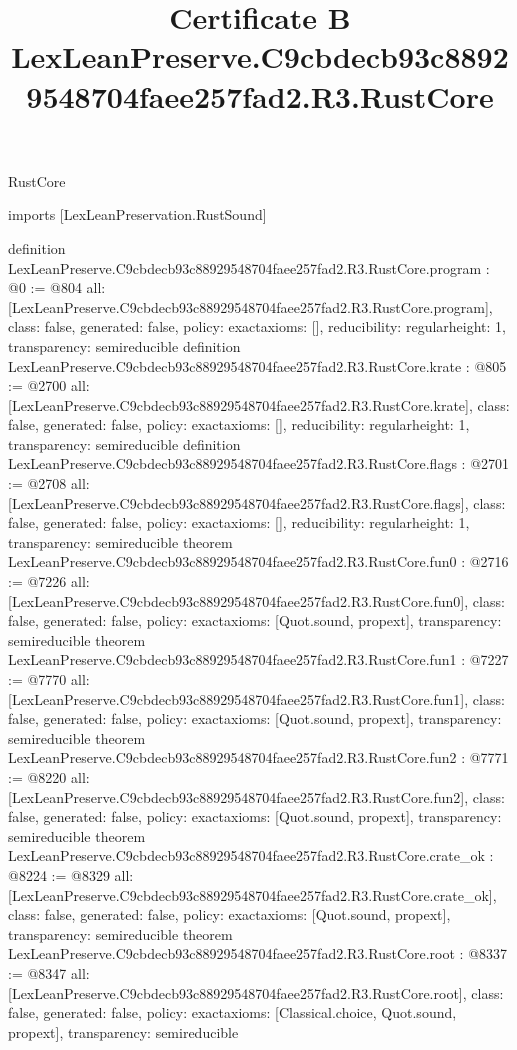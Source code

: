\begin{lexlean}{RustCore}
\title{Certificate B LexLeanPreserve.C9cbdecb93c88929548704faee257fad2.R3.RustCore}
\begin{coremodule}
imports [LexLeanPreservation.RustSound]

definition LexLeanPreserve.C9cbdecb93c88929548704faee257fad2.R3.RustCore.program : @0 := @804 {
  all: [LexLeanPreserve.C9cbdecb93c88929548704faee257fad2.R3.RustCore.program],
  class: false,
  generated: false,
  policy: exact{axioms: []},
  reducibility: regular{height: 1},
  transparency: semireducible
}
definition LexLeanPreserve.C9cbdecb93c88929548704faee257fad2.R3.RustCore.krate : @805 := @2700 {
  all: [LexLeanPreserve.C9cbdecb93c88929548704faee257fad2.R3.RustCore.krate],
  class: false,
  generated: false,
  policy: exact{axioms: []},
  reducibility: regular{height: 1},
  transparency: semireducible
}
definition LexLeanPreserve.C9cbdecb93c88929548704faee257fad2.R3.RustCore.flags : @2701 := @2708 {
  all: [LexLeanPreserve.C9cbdecb93c88929548704faee257fad2.R3.RustCore.flags],
  class: false,
  generated: false,
  policy: exact{axioms: []},
  reducibility: regular{height: 1},
  transparency: semireducible
}
theorem LexLeanPreserve.C9cbdecb93c88929548704faee257fad2.R3.RustCore.fun0 : @2716 := @7226 {
  all: [LexLeanPreserve.C9cbdecb93c88929548704faee257fad2.R3.RustCore.fun0],
  class: false,
  generated: false,
  policy: exact{axioms: [Quot.sound, propext]},
  transparency: semireducible
}
theorem LexLeanPreserve.C9cbdecb93c88929548704faee257fad2.R3.RustCore.fun1 : @7227 := @7770 {
  all: [LexLeanPreserve.C9cbdecb93c88929548704faee257fad2.R3.RustCore.fun1],
  class: false,
  generated: false,
  policy: exact{axioms: [Quot.sound, propext]},
  transparency: semireducible
}
theorem LexLeanPreserve.C9cbdecb93c88929548704faee257fad2.R3.RustCore.fun2 : @7771 := @8220 {
  all: [LexLeanPreserve.C9cbdecb93c88929548704faee257fad2.R3.RustCore.fun2],
  class: false,
  generated: false,
  policy: exact{axioms: [Quot.sound, propext]},
  transparency: semireducible
}
theorem LexLeanPreserve.C9cbdecb93c88929548704faee257fad2.R3.RustCore.crate_ok : @8224 := @8329 {
  all: [LexLeanPreserve.C9cbdecb93c88929548704faee257fad2.R3.RustCore.crate_ok],
  class: false,
  generated: false,
  policy: exact{axioms: [Quot.sound, propext]},
  transparency: semireducible
}
theorem LexLeanPreserve.C9cbdecb93c88929548704faee257fad2.R3.RustCore.root : @8337 := @8347 {
  all: [LexLeanPreserve.C9cbdecb93c88929548704faee257fad2.R3.RustCore.root],
  class: false,
  generated: false,
  policy: exact{axioms: [Classical.choice, Quot.sound, propext]},
  transparency: semireducible
}


\end{coremodule}
\end{lexlean}
